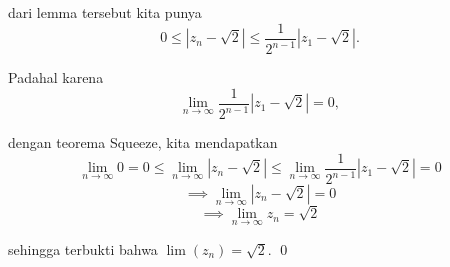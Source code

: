 \begin{enumerate}
	dari lemma tersebut kita punya $$0 \le \left|z_{n} - \sqrt{2}\right| \le \frac{1}{2^{n-1}}\left|z_1-\sqrt{2}\right|.$$
	
	Padahal karena $$\lim\limits_{n \rightarrow \infty}\frac{1}{2^{n-1}}\left|z_1-\sqrt{2}\right| = 0,$$
	
	dengan teorema Squeeze, kita mendapatkan
	$$\lim\limits_{n \rightarrow \infty} 0 = 0\le \lim\limits_{n \rightarrow \infty}\left|z_n-\sqrt{2}\right| \le \lim\limits_{n \rightarrow \infty} \frac{1}{2^{n-1}}\left|z_1-\sqrt{2}\right| = 0$$
	$$\implies \lim\limits_{n \rightarrow \infty}\left|z_n-\sqrt{2}\right| = 0$$
	$$ \implies \lim\limits_{n \rightarrow \infty}z_n = \sqrt2$$
	
	sehingga terbukti bahwa $\lim (z_n) = \sqrt{2}$. \qed
	\end{enumerate}
	
	
